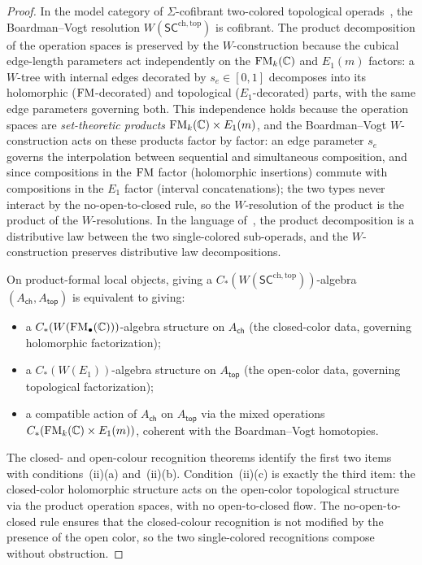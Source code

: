 \begin{proof}
In the model category of $\Sigma$-cofibrant two-colored topological
operads~\cite{BM03,CM14}, the Boardman--Vogt resolution
$W(\mathsf{SC}^{\mathrm{ch,top}})$ is cofibrant. The product
decomposition of the operation spaces is preserved by the
$W$-construction because the cubical edge-length parameters act
independently on the $\mathrm{FM}_k(\mathbb C)$ and $E_1(m)$ factors: a
$W$-tree with internal edges decorated by $s_e \in [0,1]$ decomposes
into its holomorphic ($\mathrm{FM}$-decorated) and topological
($E_1$-decorated) parts, with the same edge parameters governing
both. This independence holds because the operation spaces are
\emph{set-theoretic products} $\mathrm{FM}_k(\mathbb C) \times E_1(m)$, and
the Boardman--Vogt $W$-construction acts on these products factor by
factor: an edge parameter $s_e$ governs the interpolation between
sequential and simultaneous composition, and since compositions in the
$\mathrm{FM}$ factor (holomorphic insertions) commute with compositions in
the $E_1$ factor (interval concatenations); the two types never
interact by the no-open-to-closed rule, so the $W$-resolution of the
product is the product of the $W$-resolutions. In the language
of~\cite{BM03}, the product decomposition is a distributive law
between the two single-colored sub-operads, and the $W$-construction
preserves distributive law decompositions.

On product-formal local objects, giving a
$C_\ast(W(\mathsf{SC}^{\mathrm{ch,top}}))$-algebra
$(A_{\mathsf{ch}}, A_{\mathsf{top}})$ is equivalent to giving:
\begin{itemize}
\item a $C_\ast(W(\mathrm{FM}_\bullet(\mathbb C)))$-algebra structure on
 $A_{\mathsf{ch}}$ (the closed-color data, governing holomorphic
 factorization);
\item a $C_\ast(W(E_1))$-algebra structure on
 $A_{\mathsf{top}}$ (the open-color data, governing topological
 factorization);
\item a compatible action of $A_{\mathsf{ch}}$ on
 $A_{\mathsf{top}}$ via the mixed operations
 $C_\ast(\mathrm{FM}_k(\mathbb C) \times E_1(m))$, coherent with the
 Boardman--Vogt homotopies.
\end{itemize}
The closed- and open-colour recognition theorems identify the first two items with
conditions~(ii)(a) and~(ii)(b). Condition~(ii)(c) is exactly the
third item: the closed-color holomorphic structure acts on the
open-color topological structure via the product operation spaces,
with no open-to-closed flow. The no-open-to-closed rule ensures
that the closed-colour recognition is not modified by the
presence of the open color, so the two single-colored recognitions
compose without obstruction.


\end{proof}
